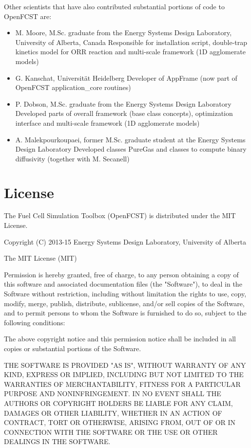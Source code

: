 Other scientists that have also contributed substantial portions of code to OpenFCST are:
\begin{itemize}
 \item M. Moore, M.Sc. graduate from the Energy Systems Design Laboratory, University of Alberta, Canada 
   \subitem Responsible for installation script, double-trap kinetics model for ORR reaction and multi-scale framework (1D agglomerate models)
 \item G. Kanschat, Universität Heidelberg
  \subitem Developer of AppFrame (now part of OpenFCST application\_core routines)
 \item P. Dobson, M.Sc. graduate from the Energy Systems Design Laboratory
    \subitem Developed parts of overall framework (base class concepts), optimization interface and multi-scale framework (1D agglomerate models)
 \item A. Malekpourkoupaei, former M.Sc. graduate student at the Energy Systems Design Laboratory
    \subitem Developed classes PureGas and classes to compute binary diffusivity (together with M. Secanell)
\end{itemize}


\section{License}

The Fuel Cell Simulation Toolbox (OpenFCST) is distributed under the MIT License.

Copyright (C) 2013-15 Energy Systems Design Laboratory, University of Alberta

The MIT License (MIT)

Permission is hereby granted, free of charge, to any person obtaining a copy of this software 
and associated documentation files (the "Software"), to deal in the Software without restriction, 
including without limitation the rights to use, copy, modify, merge, publish, distribute, 
sublicense, and/or sell copies of the Software, and to permit persons to whom the Software 
is furnished to do so, subject to the following conditions:

The above copyright notice and this permission notice shall be included in all 
copies or substantial portions of the Software.

THE SOFTWARE IS PROVIDED "AS IS", WITHOUT WARRANTY OF ANY KIND, EXPRESS OR IMPLIED, 
INCLUDING BUT NOT LIMITED TO THE WARRANTIES OF MERCHANTABILITY, FITNESS FOR A PARTICULAR 
PURPOSE AND NONINFRINGEMENT. IN NO EVENT SHALL THE AUTHORS OR COPYRIGHT HOLDERS BE LIABLE 
FOR ANY CLAIM, DAMAGES OR OTHER LIABILITY, WHETHER IN AN ACTION OF CONTRACT, TORT OR OTHERWISE, 
ARISING FROM, OUT OF OR IN CONNECTION WITH THE SOFTWARE OR THE USE OR OTHER DEALINGS IN THE SOFTWARE.


